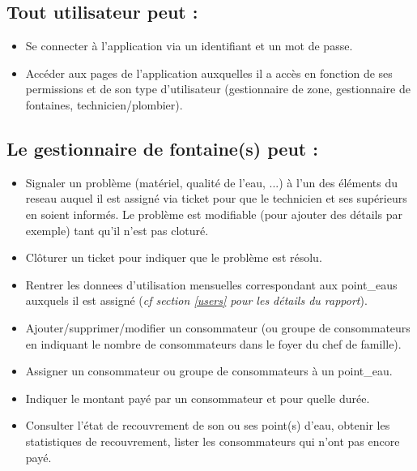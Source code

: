 \documentclass[a4paper, 11pt]{article}
\begin{document}
\subsection{Tout \gls{utilisateur} peut :}
\begin{itemize}
  \item Se connecter à l'\gls{application} via un identifiant et un mot de passe.
  \item Accéder aux pages de l'\gls{application} auxquelles il a accès en fonction de ses \glspl{permission} et de son type d'\gls{utilisateur} (gestionnaire de \gls{zone}, gestionnaire de \glspl{fontaine}, technicien/plombier).
\end{itemize}

\subsection{Le gestionnaire de \gls{fontaine}(s) peut :}
\begin{itemize}
  \item Signaler un problème (matériel, qualité de l'eau, ...) à l'un des éléments du \gls{reseau} auquel il est assigné via \gls{ticket} pour que le technicien et ses supérieurs en soient informés. Le problème est modifiable (pour ajouter des détails par exemple) tant qu'il n'est pas cloturé.
  \item Clôturer un \gls{ticket} pour indiquer que le problème est résolu.
  \item Rentrer les \glspl{donnee} d'utilisation mensuelles correspondant aux \glspl{point_eau} auxquels il est assigné (\emph{cf section \ref{users} pour les détails du rapport}).
  \item Ajouter/supprimer/modifier un \gls{consommateur} (ou groupe de \glspl{consommateur} en indiquant le nombre de \glspl{consommateur} dans le foyer du chef de famille).
  \item Assigner un \gls{consommateur} ou groupe de \glspl{consommateur} à un \gls{point_eau}.
  \item Indiquer le montant payé par un \gls{consommateur} et pour quelle durée.
  \item Consulter l'état de recouvrement de son ou ses point(s) d'eau, obtenir les statistiques de recouvrement, lister les \glspl{consommateur} qui n'ont pas encore payé.
\end{itemize}
\end{document}
